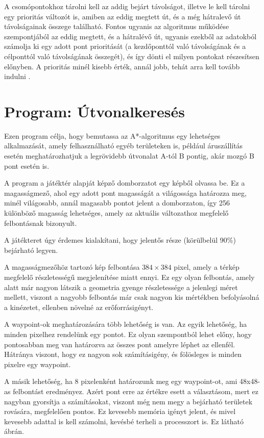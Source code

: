 A csomópontokhoz tárolni kell az addig bejárt távolságot, illetve le kell tárolni egy prioritás változót is, amiben az eddig megtett út, és a még hátralevő út távolságainak összege található. Fontos ugyanis az algoritmus működése szempontjából az eddig megtett, és a hátralévő út, ugyanis ezekből az adatokból számolja ki egy adott pont prioritását (a kezdőponttól való távolságának és a célponttól való távolságának összegét), és így dönti el milyen pontokat részesítsen előnyben. A prioritás minél kisebb érték, annál jobb, tehát arra kell tovább indulni \cite{Astar3}.

\section{Program: Útvonalkeresés}

Ezen program célja, hogy bemutassa az A*-algoritmus egy lehetséges alkalmazását, amely felhasználható egyéb területeken is, például áruszállítás esetén meghatározhatjuk a legrövidebb útvonalat A-tól B pontig, akár mozgó B pont esetén is.

A program a játéktér alapját képző domborzatot egy képből olvassa be. Ez a magasságmező, ahol egy adott pont magasságát a világossága határozza meg, minél világosabb, annál magasabb pontot jelent a domborzaton, így 256 különböző magasság lehetséges, amely az aktuális változathoz megfelelő felbontásnak bizonyult. 

A játékteret úgy érdemes kialakítani, hogy jelentős része (körülbelül 90\%) bejárható legyen.

A magasságmezőhöz tartozó kép felbontása $384 \times 384$ pixel, amely a térkép megfelelő részletességű megjelenítése miatt ennyi. Ez egy olyan felbontás, amely alatt már nagyon látszik a geometria gyenge részletessége a jelenlegi méret mellett, viszont a nagyobb felbontás már csak nagyon kis mértékben befolyásolná a kinézetet, ellenben növelné az erőforrásigényt. 

A waypoint-ok meghatározására több lehetőség is van. Az egyik lehetőség, ha minden pixelhez rendelünk egy pontot. Ez olyan szempontból lehet előny, hogy pontosabban meg van határozva az összes pont amelyre léphet az ellenfél. Hátránya viszont, hogy ez nagyon sok számításigény, és fölösleges is minden pixelre egy waypoint.

A másik lehetőség, ha 8 pixelenként határozunk meg egy waypoint-ot, ami 48x48-as felbontást eredményez. Azért pont erre az értékre esett a választásom, mert ez nagyban gyorsítja a számításokat, viszont még nem megy a bejárható területek rovására, megfelelően pontos. Ez kevesebb memória igényt jelent, és mivel kevesebb adattal is kell számolni, kevésbé terheli a processzort is. Ez látható  ábrán.

